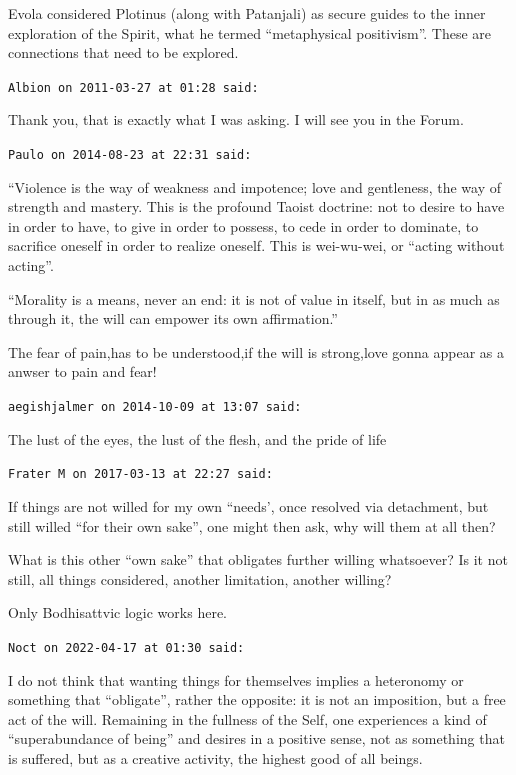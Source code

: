 \begin{footnotesize}
\begin{sffamily}
Evola considered Plotinus (along with Patanjali) as secure guides to the inner exploration of the Spirit, what he termed ``metaphysical positivism''. These are connections that need to be explored.

\hfill

\texttt{Albion on 2011-03-27 at 01:28 said:}

Thank you, that is exactly what I was asking. I will see you in the Forum.

\hfill

\texttt{Paulo on 2014-08-23 at 22:31 said:}

``Violence is the way of weakness and impotence; love and gentleness, the way of strength and mastery. This is the profound Taoist doctrine: not to desire to have in order to have, to give in order to possess, to cede in order to dominate, to sacrifice oneself in order to realize oneself. This is wei-wu-wei, or ``acting without acting''.

``Morality is a means, never an end: it is not of value in itself, but in as much as through it, the will can empower its own affirmation.''

The fear of pain,has to be understood,if the will is strong,love gonna appear as a anwser to pain and fear!

\hfill

\texttt{aegishjalmer on 2014-10-09 at 13:07 said:}

The lust of the eyes, the lust of the flesh, and the pride of life

\hfill

\texttt{Frater M on 2017-03-13 at 22:27 said:}

If things are not willed for my own ``needs', once resolved via detachment, but still willed ``for their own sake'', one might then ask, why will them at all then?

What is this other ``own sake'' that obligates further willing whatsoever? Is it not still, all things considered, another limitation, another willing?

Only Bodhisattvic logic works here.

\hfill

\texttt{Noct on 2022-04-17 at 01:30 said:}

I do not think that wanting things for themselves implies a heteronomy or something that ``obligate'', rather the opposite: it is not an imposition, but a free act of the will. Remaining in the fullness of the Self, one experiences a kind of ``superabundance of being'' and desires in a positive sense, not as something that is suffered, but as a creative activity, the highest good of all beings.


\end{sffamily}
\end{footnotesize}
